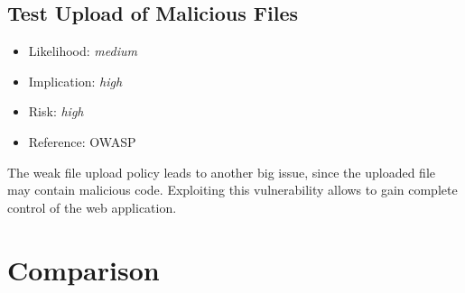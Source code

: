 \subsection{Test Upload of Malicious Files} \label{over:malicious}
\begin{itemize}
	\item Likelihood: \textit{medium}
	\item Implication: \textit{high}
	\item Risk: \textit{high}
	\item Reference: OWASP 
\end{itemize}
The weak file upload policy leads to another big issue, since the uploaded file may contain malicious code. Exploiting this vulnerability allows to gain complete control of the web application.

\section{\gnb}

\section{Comparison}
